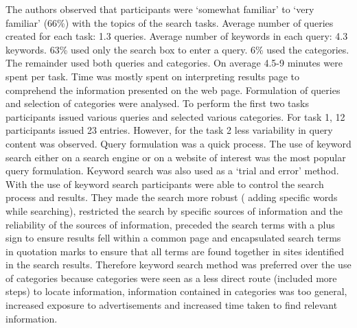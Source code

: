 \documentclass[]{article}
\begin{document}
The authors observed that participants were ‘somewhat familiar’ to ‘very familiar’ (66\%) with the topics of the search tasks. Average number of queries created for each task: 1.3 queries. Average number of keywords in each query: 4.3 keywords. 63\% used only the search box to enter a query. 6\% used the categories. The remainder used both queries and categories. On average 4.5-9 minutes were spent per task. Time was mostly spent on interpreting results page to comprehend the information presented on the web page. Formulation of queries and selection of categories were analysed. To perform the first two tasks participants issued various queries and selected various categories. For task 1, 12 participants issued 23 entries. However, for the task 2 less variability in query content was observed. Query formulation was a quick process. The use of keyword search either on a search engine or on a website of interest was the most popular query formulation. Keyword search was also used as a ‘trial and error’ method. With the use of keyword search participants were able to control the search process and results. They made the search more robust ( adding specific words while searching), restricted the search by specific sources of information and the reliability of the sources of information, preceded the search terms with a plus sign to ensure results fell within a common page and encapsulated search terms in quotation marks to ensure that all terms are found together in sites identified in the search results. Therefore keyword search method was preferred over the use of categories because categories were seen as a less direct route (included more steps) to locate information, information contained in categories was too general, increased exposure to advertisements and increased time taken to find relevant information.
\end{document}
